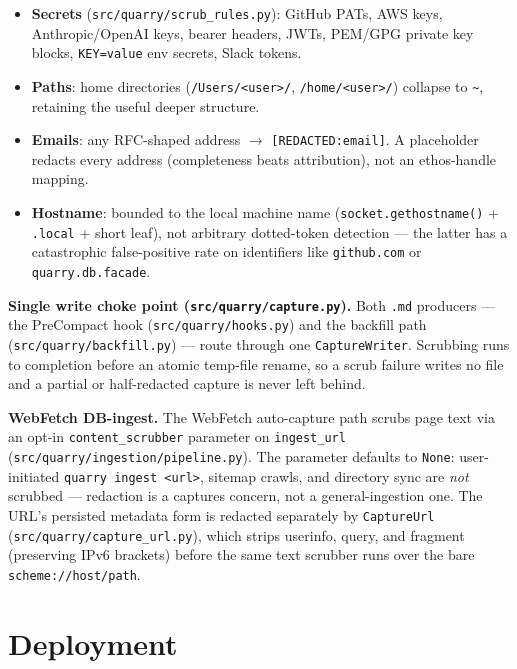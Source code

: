 \documentclass[a4paper,10pt]{article}
\newcommand{\modpath}[1]{\texttt{src/quarry/#1}}
\begin{document}
\begin{itemize}
  \item \textbf{Secrets} (\modpath{scrub\_rules.py}): GitHub PATs, AWS
    keys, Anthropic/OpenAI keys, bearer headers, JWTs, PEM/GPG private
    key blocks, \texttt{KEY=value} env secrets, Slack tokens.
  \item \textbf{Paths}: home directories (\texttt{/Users/<user>/},
    \texttt{/home/<user>/}) collapse to \texttt{\~{}}, retaining the
    useful deeper structure.
  \item \textbf{Emails}: any RFC-shaped address $\to$
    \texttt{[REDACTED:email]}.  A placeholder redacts every address
    (completeness beats attribution), not an ethos-handle mapping.
  \item \textbf{Hostname}: bounded to the local machine name
    (\texttt{socket.gethostname()} + \texttt{.local} + short leaf), not
    arbitrary dotted-token detection --- the latter has a catastrophic
    false-positive rate on identifiers like \texttt{github.com} or
    \texttt{quarry.db.facade}.
\end{itemize}

\textbf{Single write choke point (\modpath{capture.py}).}  Both
\texttt{.md} producers --- the PreCompact hook (\modpath{hooks.py}) and
the backfill path (\modpath{backfill.py}) --- route through one
\texttt{CaptureWriter}.  Scrubbing runs to completion before an atomic
temp-file rename, so a scrub failure writes no file and a partial or
half-redacted capture is never left behind.

\textbf{WebFetch DB-ingest.}  The WebFetch auto-capture path scrubs page
text via an opt-in \texttt{content\_scrubber} parameter on
\texttt{ingest\_url} (\modpath{ingestion/pipeline.py}).  The parameter
defaults to \texttt{None}: user-initiated \texttt{quarry ingest <url>},
sitemap crawls, and directory sync are \emph{not} scrubbed --- redaction
is a captures concern, not a general-ingestion one.  The URL's persisted
metadata form is redacted separately by \texttt{CaptureUrl}
(\modpath{capture\_url.py}), which strips userinfo, query, and fragment
(preserving IPv6 brackets) before the same text scrubber runs over the
bare \texttt{scheme://host/path}.

\section{Deployment}
\end{document}
